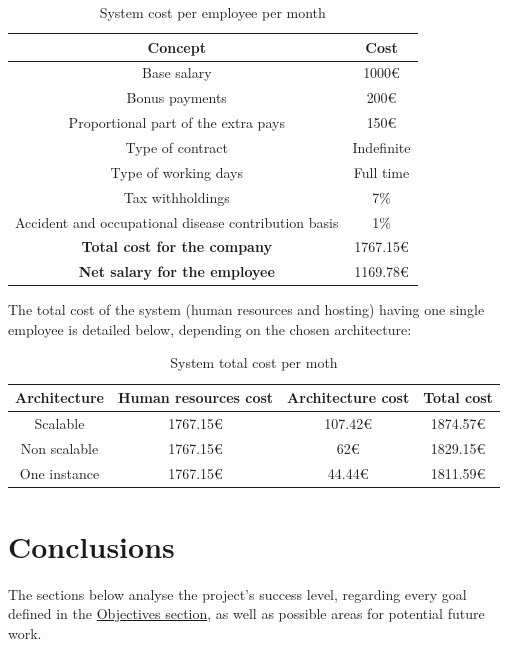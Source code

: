 \documentclass[12pt,english]{article}
\begin{document}
\begin{table}[h!]
  \centering
  \begin{tabular}{|c|c|}
    \hline
    \textbf{Concept} & \textbf{Cost} \\
    \hline
    Base salary & 1000\euro \\
    Bonus payments & 200\euro \\
    Proportional part of the extra pays & 150\euro \\
    Type of contract & Indefinite \\
    Type of working days & Full time \\
    Tax withholdings & 7\% \\
    Accident and occupational disease contribution basis & 1\% \\
    \hline
     \textbf{Total cost for the company} & 1767.15\euro \\
      \textbf{Net salary for the employee} & 1169.78\euro \\
    \hline
  \end{tabular}
  \caption{System cost per employee per month}
\end{table}

The total cost of the system (human resources and hosting) having one single employee is detailed below, depending on the chosen architecture:

\begin{table}[h!]
  \centering
  \begin{tabular}{|c|c|c|c|}
    \hline
    \textbf{Architecture} & \textbf{Human resources cost} & \textbf{Architecture cost} & \textbf{Total cost}\\
    \hline
     Scalable & 1767.15\euro & 107.42\euro & 1874.57\euro \\
     Non scalable & 1767.15\euro & 62\euro & 1829.15\euro \\
     One instance & 1767.15\euro & 44.44\euro & 1811.59\euro \\
     \hline
  \end{tabular}
  \caption{System total cost per moth}
\end{table}
\newpage
\section{Conclusions}

The sections below analyse the project's success level, regarding every goal defined in the \hyperref[sec:objectives]{Objectives section}, as well as possible areas for potential future work.
\end{document}
